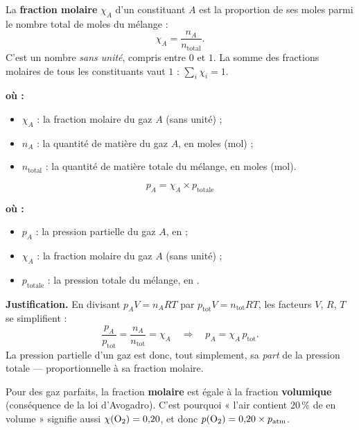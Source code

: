 \documentclass[11pt,a4paper]{article}
\newenvironment{ou}{%
  \par\smallskip\noindent\textbf{où :}\nopagebreak
  \begin{itemize}[leftmargin=1.8em,topsep=2pt,itemsep=1.5pt,parsep=0pt]}%
  {\end{itemize}}
\newcommand{\GP}{gaz parfaits}
\begin{document}
\begin{definition}
La \textbf{fraction molaire} $\chi_A$ d'un constituant $A$ est la proportion de ses moles parmi le
nombre total de moles du mélange :
\[ \chi_A = \frac{n_A}{n_{\text{total}}}. \]
C'est un nombre \emph{sans unité}, compris entre $0$ et $1$. La somme des fractions molaires de tous
les constituants vaut $1$ : $\sum_i \chi_i = 1$.
\end{definition}

\begin{ou}
  \item $\chi_A$ : la fraction molaire du gaz $A$ (sans unité) ;
  \item $n_A$ : la quantité de matière du gaz $A$, en moles (\si{\mole}) ;
  \item $n_{\text{total}}$ : la quantité de matière totale du mélange, en moles (\si{\mole}).
\end{ou}

\begin{formule}
\[ \boxed{\,p_A = \chi_A \times p_{\text{totale}}\,} \]
\end{formule}

\begin{ou}
  \item $p_A$ : la pression partielle du gaz $A$, en \si{\atm} ;
  \item $\chi_A$ : la fraction molaire du gaz $A$ (sans unité) ;
  \item $p_{\text{totale}}$ : la pression totale du mélange, en \si{\atm}.
\end{ou}

\noindent\textbf{Justification.} En divisant $p_A V = n_A RT$ par $p_{\text{tot}}V=n_{\text{tot}}RT$,
les facteurs $V$, $R$, $T$ se simplifient :
\[ \frac{p_A}{p_{\text{tot}}}=\frac{n_A}{n_{\text{tot}}}=\chi_A
   \quad\Longrightarrow\quad p_A=\chi_A\,p_{\text{tot}}. \]
La pression partielle d'un gaz est donc, tout simplement, sa \emph{part} de la pression totale —
proportionnelle à sa fraction molaire.

\begin{remarque}
Pour des \GP, la fraction \textbf{molaire} est égale à la fraction \textbf{volumique} (conséquence de
la loi d'Avogadro). C'est pourquoi « l'air contient $20\,\%$ de  en volume » signifie aussi
$\chi(\ce{O2})=0{,}20$, et donc $p(\ce{O2})=0{,}20\times p_{\text{atm}}$.
\end{remarque}
\end{document}
